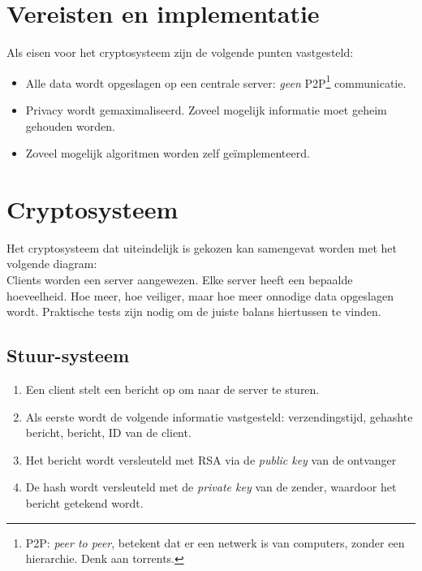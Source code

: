 \documentclass{report} %
\begin{document}
\section{Vereisten en implementatie}
Als eisen voor het cryptosysteem zijn de volgende punten vastgesteld:
\begin{itemize}
    \item Alle data wordt opgeslagen op een centrale server: \textit{geen} P2P\footnote{P2P: \textit{peer to peer}, betekent dat er een netwerk is van computers, zonder een hierarchie. Denk aan torrents.} communicatie.
    \item Privacy wordt gemaximaliseerd. Zoveel mogelijk informatie moet geheim gehouden worden.
    \item Zoveel mogelijk algoritmen worden zelf geïmplementeerd.
\end{itemize}

\section{Cryptosysteem}
Het cryptosysteem dat uiteindelijk is gekozen kan samengevat worden met het volgende diagram: \\
%
%
%
%
Clients worden een server aangewezen. Elke server heeft een bepaalde hoeveelheid. Hoe meer, hoe veiliger, maar hoe meer onnodige data opgeslagen wordt. Praktische tests zijn nodig om de juiste balans hiertussen te vinden.
\subsection{Stuur-systeem}
\begin{enumerate}
    \item Een client stelt een bericht op om naar de server te sturen.
    \item Als eerste wordt de volgende informatie vastgesteld: verzendingstijd, gehashte bericht, bericht, ID van de client.
    \item Het bericht wordt versleuteld met RSA via de \textit{public key} van de ontvanger
    \item De hash wordt versleuteld met de \textit{private key} van de zender, waardoor het bericht getekend wordt.
\end{enumerate}
\end{document}
